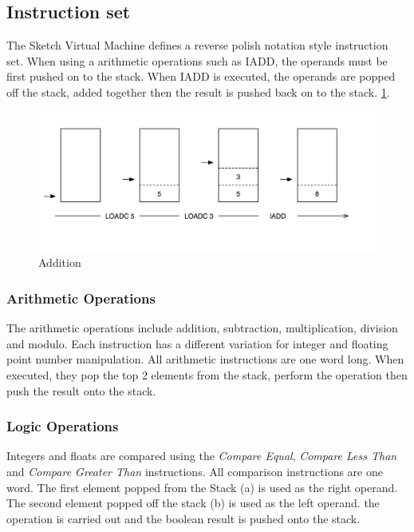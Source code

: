 \documentclass{l3proj}
\begin{document}
\subsection{Instruction set}
The Sketch Virtual Machine defines a reverse polish notation style instruction set. When using a arithmetic operations such as IADD, the operands must be first pushed on to the stack. When IADD is executed, the operands are popped off the stack, added together then the result is pushed back on to the stack.
\ref{fig:add-insruction}.
\begin{figure}[!h]
	\centering
	\includegraphics[width=\textwidth]{images/add-instruction}
	\caption{Addition}
	\label{fig:add-insruction}
\end{figure}

\subsubsection{Arithmetic Operations}
The arithmetic operations include addition, subtraction, multiplication, division and modulo. Each instruction has a different variation for integer and floating point number manipulation. All arithmetic instructions are one word long. When executed, they pop the top 2 elements from the stack, perform the operation then push the result onto the stack.

\subsubsection{Logic Operations}
Integers and floats are compared using the \textit{Compare Equal}, \textit{Compare Less Than} and \textit{Compare Greater Than} instructions. All comparison instructions are one word. The first element popped from the Stack (a) is used as the right operand. The second element popped off the stack (b) is used as the left operand. the operation is carried out and the boolean result is pushed onto the stack.
\end{document}
